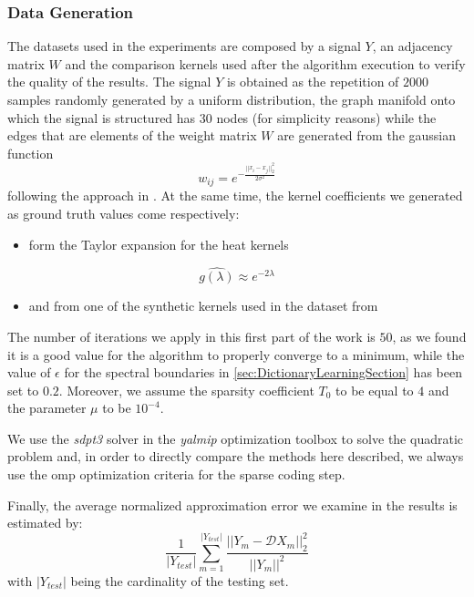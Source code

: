 \subsubsection{Data Generation}
The datasets used in the experiments are composed by a signal $Y$, an adjacency matrix $W$ and the comparison kernels used after the algorithm execution to verify the quality of the results. The signal $Y$ is obtained as the repetition of $2000$ samples randomly generated by a uniform distribution, the graph manifold onto which the signal is structured has $30$ nodes (for simplicity reasons) while the edges that are elements of the weight matrix $W$ are generated from the gaussian function
\begin{equation}
  w_{ij} = e^{-\frac{||x_i - x_j||_2^2}{2\sigma^2}}
\end{equation}
following the approach in \cite{Kalofolias2016}. At the same time, the kernel coefficients we generated as ground truth values come respectively:
\begin{itemize}
  \item form the Taylor expansion for the heat kernels
\end{itemize}
\begin{equation}
  \hat{g(\lambda)} \approx e^{-2\lambda}
\end{equation}
\begin{itemize}
  \item and from one of the synthetic kernels used in the dataset from \cite{Thanou2014}
\end{itemize}

The number of iterations we apply in this first part of the work is $50$, as we found it is a good value for the algorithm to properly converge to a minimum, while the value of $\epsilon$ for the spectral boundaries in \ref{sec:DictionaryLearningSection} has been set to $0.2$. Moreover, we assume the sparsity coefficient $T_0$ to be equal to $4$ and the parameter $\mu$ to be $10^{-4}$.

We use the \textit{sdpt3} solver in the \textit{yalmip} optimization toolbox to solve the quadratic problem and, in order to directly compare the methods here described, we always use the \gls{omp} optimization criteria for the sparse coding step.

Finally, the average normalized approximation error we examine in the results is estimated by:
\begin{equation}
  \frac{1}{|Y_{test}|}\sum_{m=1}^{|Y_{test}|}\frac{||Y_m - \mathcal{D}X_m||_2^2}{||Y_m||^2}
\end{equation}
with $|Y_{test}|$ being the cardinality of the testing set.

